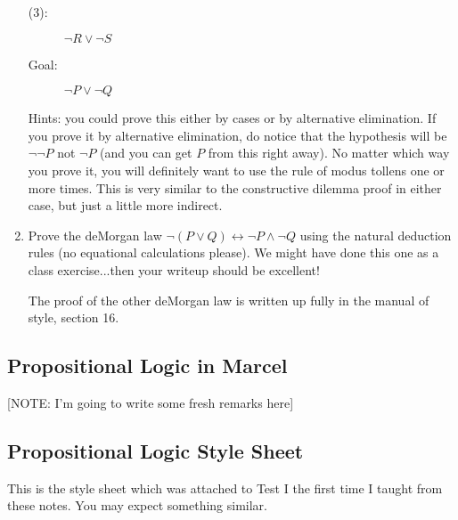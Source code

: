 \documentclass[12pt]{article}
\begin{document}
\begin{enumerate}
\begin{description}
\item[(3):]  $\neg R \vee \neg S$

\item[Goal:]  $\neg P \vee \neg Q$

\end{description}

Hints:  you could prove this either by cases or by alternative elimination.  If you prove it by alternative elimination, do notice
that the hypothesis will be $\neg\neg P$ not $\neg P$ (and you can get $P$ from this right away).  No matter which way you prove it,
you will definitely want to use the rule of modus tollens one or more times.  This is very similar to the constructive dilemma proof in either case, but just a little more indirect.

\item  Prove the deMorgan law $\neg(P \vee Q) \leftrightarrow \neg P \wedge \neg Q$ using the natural deduction rules (no equational calculations please).  We might have done this one as a class exercise...then your writeup should be excellent!

The proof of the other deMorgan law is written up fully in the manual of style, section 16.

\begin{comment}

\item  Prove that the sum of two odd numbers is even, using the same definitions and style as in my in-class proof that the product of two odd numbers is odd (which appears in the notes on the previous pages).

\end{comment}


\end{enumerate}
\newpage

\subsection{Propositional Logic in Marcel}

[NOTE:  I'm going to write some fresh remarks here]

\subsection{Propositional Logic Style Sheet}

This is the style sheet which was attached to Test I the first time I taught from these notes.  You may expect something similar.
\end{document}
